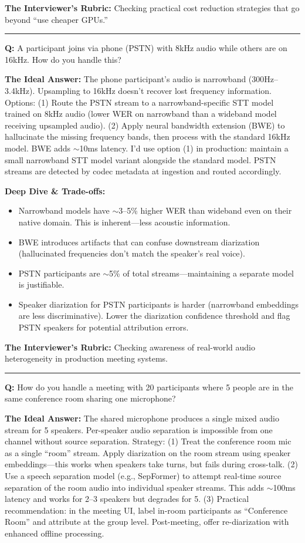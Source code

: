 \textbf{The Interviewer's Rubric:} Checking practical cost reduction strategies that go beyond ``use cheaper GPUs.''

\bigskip\hrule\bigskip

\textbf{Q:} A participant joins via phone (PSTN) with 8kHz audio while others are on 16kHz. How do you handle this?

\textbf{The Ideal Answer:} The phone participant's audio is narrowband (300Hz--3.4kHz). Upsampling to 16kHz doesn't recover lost frequency information. Options: (1) Route the PSTN stream to a narrowband-specific STT model trained on 8kHz audio (lower WER on narrowband than a wideband model receiving upsampled audio). (2) Apply neural bandwidth extension (BWE) to hallucinate the missing frequency bands, then process with the standard 16kHz model. BWE adds $\sim$10ms latency. I'd use option (1) in production: maintain a small narrowband STT model variant alongside the standard model. PSTN streams are detected by codec metadata at ingestion and routed accordingly.

\textbf{Deep Dive \& Trade-offs:}
\begin{itemize}
  \item Narrowband models have $\sim$3--5\% higher WER than wideband even on their native domain. This is inherent---less acoustic information.
  \item BWE introduces artifacts that can confuse downstream diarization (hallucinated frequencies don't match the speaker's real voice).
  \item PSTN participants are $\sim$5\% of total streams---maintaining a separate model is justifiable.
  \item Speaker diarization for PSTN participants is harder (narrowband embeddings are less discriminative). Lower the diarization confidence threshold and flag PSTN speakers for potential attribution errors.
\end{itemize}

\textbf{The Interviewer's Rubric:} Checking awareness of real-world audio heterogeneity in production meeting systems.

\bigskip\hrule\bigskip

\textbf{Q:} How do you handle a meeting with 20 participants where 5 people are in the same conference room sharing one microphone?

\textbf{The Ideal Answer:} The shared microphone produces a single mixed audio stream for 5 speakers. Per-speaker audio separation is impossible from one channel without source separation. Strategy: (1) Treat the conference room mic as a single ``room'' stream. Apply diarization on the room stream using speaker embeddings---this works when speakers take turns, but fails during cross-talk. (2) Use a speech separation model (e.g., SepFormer) to attempt real-time source separation of the room audio into individual speaker streams. This adds $\sim$100ms latency and works for 2--3 speakers but degrades for 5. (3) Practical recommendation: in the meeting UI, label in-room participants as ``Conference Room'' and attribute at the group level. Post-meeting, offer re-diarization with enhanced offline processing.

